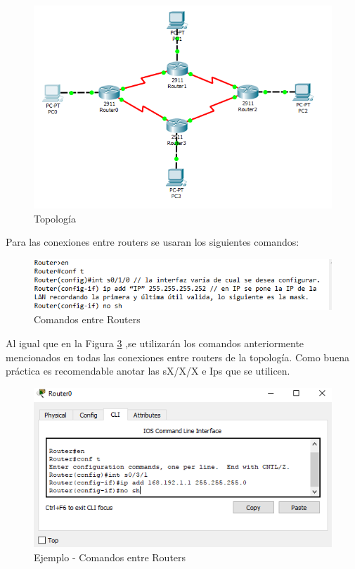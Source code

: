 \documentclass{article}
\begin{document}
\begin{figure}[h!]
\centering
\includegraphics[scale=0.6]{Top.png}
\caption{Topología}
\label{fig:topo}
\end{figure}

Para las conexiones entre routers se usaran los siguientes comandos:

\begin{figure}[h!]
\centering
\includegraphics[scale=0.65]{EntreR.png}
\caption{Comandos entre Routers}
\label{fig:com1}
\end{figure}

Al igual que en la Figura \ref{fig:ejem1} ,se utilizarán los comandos anteriormente mencionados en todas las conexiones entre routers de la topología. Como buena práctica es recomendable anotar las sX/X/X e Ips que se utilicen.

\newpage

\begin{figure}[h!]
\centering
\includegraphics[scale=0.65]{Ej1.png}
\caption{Ejemplo - Comandos entre Routers}
\label{fig:ejem1}
\end{figure}
\end{document}
